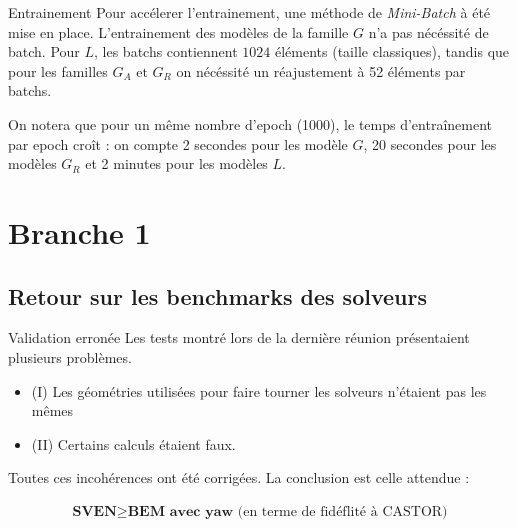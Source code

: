 \documentclass[
11pt,notheorems,hyperref={pdfauthor=whatever}
]{beamer}
\begin{document}
\begin{frame}{Entrainement}
    Pour accélerer l'entrainement, une méthode de \textit{Mini-Batch} à été mise en place. L'entrainement des modèles de la famille 
    $G$ n'a pas nécéssité de batch. Pour $L$, les batchs contiennent $1024$ éléments (taille classiques), tandis que pour les familles $G_A \text{ et } G_R$
    on nécéssité un réajustement à 52 éléments par batchs.

    \vspace{0.3cm}

    On notera que pour un même nombre d'epoch (1000), le temps d'entraînement par epoch croît : on compte 2 secondes pour les modèle $G$, 20 secondes pour les modèles $G_R$
    et 2 minutes pour les modèles $L$.
    
\end{frame}


\section{Branche 1}

\subsection{Retour sur les benchmarks des solveurs}
\begin{frame}{Validation erronée}
    Les tests montré lors de la dernière réunion présentaient plusieurs problèmes. 
    \begin{itemize}
        \item (I) Les géométries utilisées pour faire tourner les solveurs n'étaient pas les mêmes         
        \item (II) Certains calculs étaient faux.
    \end{itemize}
    \vspace{0.2cm}
    Toutes ces incohérences ont été corrigées. La conclusion est celle attendue : 
    
    \vspace{0.3cm}

    \begin{align}
            \textbf{SVEN} \geq \textbf{BEM avec yaw} \text{ (en terme de fidéflité à CASTOR)}
    \end{align}
\end{frame}
\end{document}
